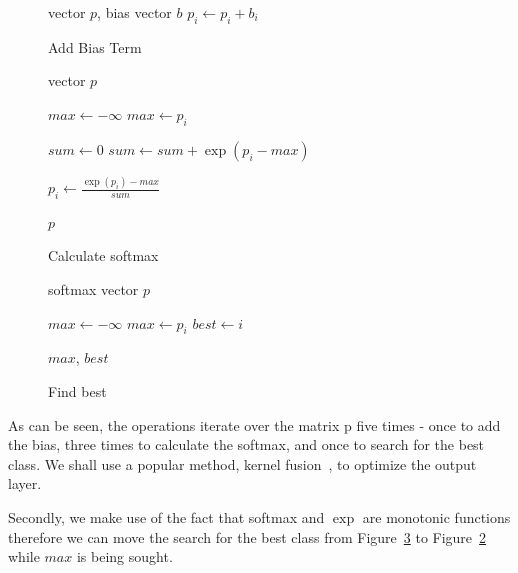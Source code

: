 \documentclass[11pt,a4paper]{article}
\begin{document}
\begin{figure} [h]
\begin{algorithmic}
\REQUIRE vector $p$, bias vector $b$
  \STATE $p_i \gets p_i + b_i$
\ENDFOR 
\end{algorithmic}
\caption{Add Bias Term}
\label{algo:Add Bias Term}
\end{figure}

\begin{figure} [h]
\begin{algorithmic}
\REQUIRE vector $p$


\STATE $max \gets - \infty$ 
    \STATE $max \gets p_i$
  \ENDIF
\ENDFOR 


\STATE $sum \gets 0$ 
  \STATE $sum \gets sum + \exp(p_i - max)$
\ENDFOR 


  \STATE $p_i \gets \frac{\exp(p_i) - max}{sum} $
\ENDFOR 

\RETURN $p$

\end{algorithmic}
\caption{Calculate softmax}
\label{algo:Calculate softmax}
\end{figure}

\begin{figure} [h]
\begin{algorithmic}
\REQUIRE softmax vector $p$

\STATE $max \gets - \infty$ 
    \STATE $max \gets p_i$
    \STATE $best \gets i$
  \ENDIF
\ENDFOR 

\RETURN $max$, $best$

\end{algorithmic}
\caption{Find best}
\label{algo:Find best}
\end{figure}


As can be seen, the operations iterate over the matrix p five times - once to add the bias, three times to calculate the softmax, and once to search for the best class. We shall use a popular method, kernel fusion~\citep{Guevara2009EnablingTP}, to optimize the output layer.

Secondly, we make use of the fact that softmax and $\exp$ are monotonic functions therefore we can move the search for the best class from Figure~\ref{algo:Find best} to Figure~\ref{algo:Calculate softmax} while $max$ is being sought.
\end{document}
